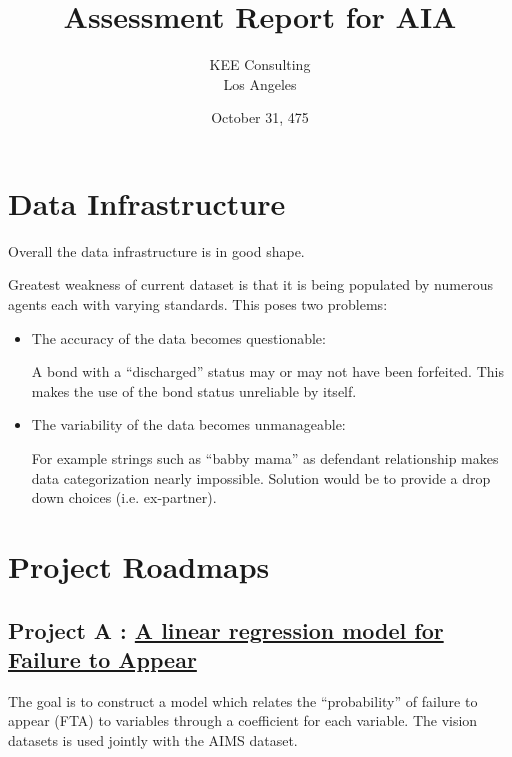 \documentclass{article}
\begin{document}
\title{Assessment Report for AIA}
\date{October 31, 475}
\author{KEE Consulting\\ 
        Los Angeles}

\maketitle
\clearpage
\section{Data Infrastructure}

Overall the data infrastructure is in good shape. 

Greatest weakness of current dataset is that it is being populated by numerous agents each with varying standards.  This poses two problems:

\begin{itemize}
\item The accuracy of the data becomes questionable:

A bond with a ``discharged'' status may or may not have been forfeited. This makes the use of the bond status unreliable by itself.  
 
\item The variability of the data becomes unmanageable:

For example strings such as “babby mama” as defendant relationship makes data categorization nearly impossible. Solution would be to provide a drop down choices (i.e. ex-partner).
\end{itemize}

\section{Project Roadmaps}
\subsection{Project A : \underline{A linear regression model for Failure to Appear}}
The goal is to construct a model which relates the “probability” of failure to appear (FTA) to variables through a coefficient for each variable. The vision datasets is used jointly with the AIMS dataset.     
\end{document}
